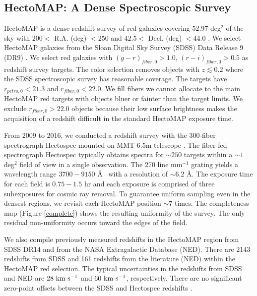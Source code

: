 \documentclass[iop, apj]{emulateapj}
\newcommand{\kms}{\rm km~s^{-1}}
\begin{document}
\subsection{HectoMAP: A Dense Spectroscopic Survey}\label{hmap}

HectoMAP is a dense redshift survey of red galaxies
 covering 52.97 deg$^{2}$ of the sky with $200 < $ R.A. (deg) $< 250$ and $42.5 <$ Decl. (deg) $< 44.0$
 \citep{Geller11, Geller15, Hwang16}. 
We select HectoMAP galaxies from the Sloan Digital Sky Survey (SDSS) Data Release 9 (DR9)
 \citep{Ahn12}.
We select red galaxies with $(g-r)_{fiber, 0} > 1.0$, $(r-i)_{fiber, 0} > 0.5$
 as redshift survey targets.  
The color selection removes objects with $z \lesssim 0.2$ 
 where the SDSS spectroscopic survey has reasonable coverage.
The targets have $r_{petro, 0} < 21.3$ and $r_{fiber, 0} < 22.0$. 
We fill fibers we cannot allocate to the main HectoMAP red targets with objects bluer or fainter than the target limits.
We exclude $r_{fiber, 0} > 22.0$ objects 
 because their low surface brightness makes the acquisition of a redshift difficult 
 in the standard HectoMAP exposure time. 

From 2009 to 2016, 
 we conducted a redshift survey with the 300-fiber spectrograph Hectospec 
 mounted on MMT 6.5m telescope \citep{Fabricant98, Fabricant05}.
The fiber-fed spectrograph Hectospec typically obtains spectra for $\sim250$ targets 
 within a $\sim1$ deg$^{2}$ field of view in a single observation. 
The 270 line mm$^{-1}$ grating  
 yields a wavelength range $3700 - 9150$ \AA~ with 
 a resolution of $\sim6.2$ \AA. 
The exposure time for each field is $0.75 - 1.5$ hr and 
 each exposure is comprised of three subexposures for cosmic ray removal. 
To guarantee uniform sampling even in the densest regions,
 we revisit each HectoMAP position $\sim 7$ times. 
The completeness map (Figure \ref{complete}) shows the resulting uniformity of the survey. 
The only residual non-uniformity occurs toward the edges of the field. 

We also compile previously measured redshifts in the HectoMAP region from SDSS DR14 \citep{Abolfathi17} and
 from the NASA Extragalactic Database (NED). 
There are 2143 redshifts from SDSS and 161 redshifts from the literature (NED) within the HectoMAP red selection. 
The typical uncertainties in the redshifts from SDSS and NED are $28~\kms$ and $60~\kms$, respectively. 
There are no significant zero-point offsets between the SDSS and Hectospec redshifts \citep{Geller14}. 
\end{document}
